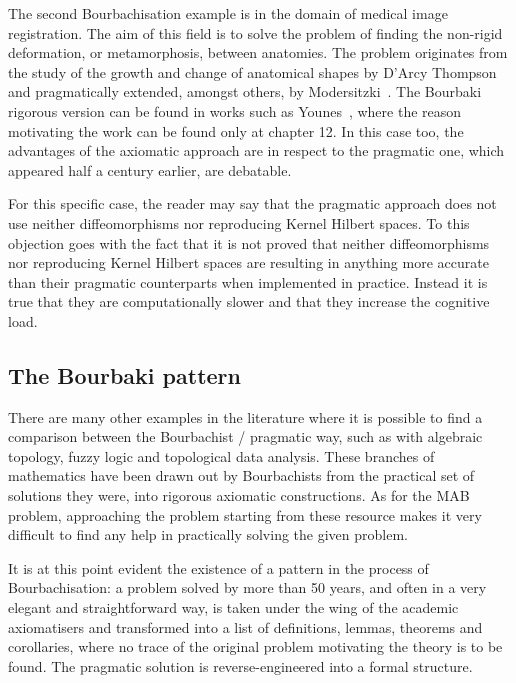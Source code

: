\documentclass[]{scrartcl}
\theoremstyle{definition}
\begin{document}
The second Bourbachisation example is in the domain of medical image registration. The aim of this field is to solve the problem of finding the non-rigid deformation, or metamorphosis, between anatomies. The problem originates from the study of the growth and change of anatomical shapes by D'Arcy Thompson~\cite{d1942growth} and pragmatically extended, amongst others, by Modersitzki~\cite{modersitzki2004numerical}. The Bourbaki rigorous version can be found in works such as Younes~\cite{younes2010shapes}, where the reason motivating the work can be found only at chapter 12.
In this case too, the advantages of the axiomatic approach are in respect to the pragmatic one, which appeared half a century earlier, are debatable.

For this specific case, the reader may say that the pragmatic approach \cite{modersitzki2004numerical} does not use neither diffeomorphisms nor reproducing Kernel Hilbert spaces. To this objection goes with the fact that it is not proved that neither diffeomorphisms nor reproducing Kernel Hilbert spaces are resulting in anything more accurate than their pragmatic counterparts when implemented in practice. Instead it is true that they are computationally slower and that they increase the cognitive load.


\subsection*{The Bourbaki pattern}

There are many other examples in the literature where it is possible to find a comparison between the Bourbachist / pragmatic way, such as with algebraic topology, fuzzy logic and topological data analysis. 
These branches of mathematics have been drawn out by Bourbachists from the practical set of solutions they were, into rigorous axiomatic constructions. As for the MAB problem, approaching the problem starting from these resource makes it very difficult to find any help in practically solving the given problem.

It is at this point evident the existence of a pattern in the process of Bourbachisation: a problem solved by more than 50 years, and often in a very elegant and straightforward way, is taken under the wing of the academic axiomatisers and transformed into a list of definitions, lemmas, theorems and corollaries, where no trace of the original problem motivating the theory is to be found. The pragmatic solution is reverse-engineered into a formal structure.
\end{document}
